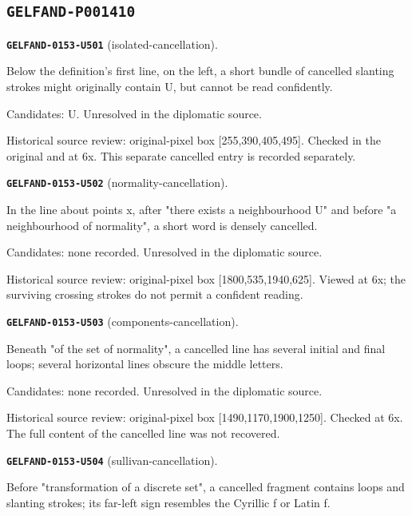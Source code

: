\subsection*{\texttt{GELFAND-P001410}}
\par\noindent\leavevmode{}\label{GELFAND-0153-U501}\textbf{\texttt{GELFAND-0153-U501}} (isolated-cancellation).\nopagebreak[4]\par
Below the definition's first line, on the left, a short bundle of cancelled slanting strokes might originally contain U, but cannot be read confidently.\par
Candidates: U. Unresolved in the diplomatic source.\par
Historical source review: original-pixel box [255,390,405,495]. Checked in the original and at 6x. This separate cancelled entry is recorded separately.\par\medskip
\par\noindent\leavevmode{}\label{GELFAND-0153-U502}\textbf{\texttt{GELFAND-0153-U502}} (normality-cancellation).\nopagebreak[4]\par
In the line about points x, after "there exists a neighbourhood U" and before "a neighbourhood of normality", a short word is densely cancelled.\par
Candidates: none recorded. Unresolved in the diplomatic source.\par
Historical source review: original-pixel box [1800,535,1940,625]. Viewed at 6x; the surviving crossing strokes do not permit a confident reading.\par\medskip
\par\noindent\leavevmode{}\label{GELFAND-0153-U503}\textbf{\texttt{GELFAND-0153-U503}} (components-cancellation).\nopagebreak[4]\par
Beneath "of the set of normality", a cancelled line has several initial and final loops; several horizontal lines obscure the middle letters.\par
Candidates: none recorded. Unresolved in the diplomatic source.\par
Historical source review: original-pixel box [1490,1170,1900,1250]. Checked at 6x. The full content of the cancelled line was not recovered.\par\medskip
\par\noindent\leavevmode{}\label{GELFAND-0153-U504}\textbf{\texttt{GELFAND-0153-U504}} (sullivan-cancellation).\nopagebreak[4]\par
Before "transformation of a discrete set", a cancelled fragment contains loops and slanting strokes; its far-left sign resembles the Cyrillic f or Latin f.\par
